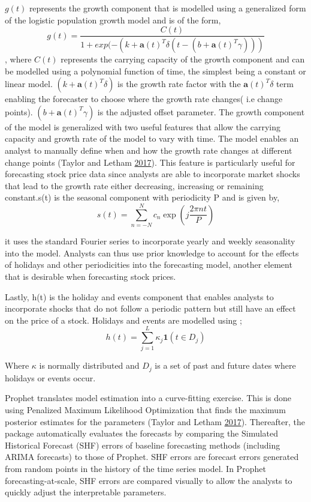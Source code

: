 \documentclass[12pt,preprint, authoryear]{elsarticle}
\numberwithin{equation}{section}
\numberwithin{figure}{section}
\numberwithin{table}{section}
\begin{document}
\(g(t)\) represents the growth component that is modelled using a
generalized form of the logistic population growth model and is of the
form,
\[g(t) = \frac{C(t)}{1+exp(-(k+\boldsymbol{a}(t)^T \delta(t-(b+\boldsymbol{a}(t)^T \gamma)))}\],
where \(C(t)\) represents the carrying capacity of the growth component
and can be modelled using a polynomial function of time, the simplest
being a constant or linear model. \((k+\boldsymbol{a}(t)^T\delta)\) is
the growth rate factor with the \(\boldsymbol{a}(t)^T\delta\) term
enabling the forecaster to choose where the growth rate changes( i.e
change points). \((b+\boldsymbol{a}(t)^T \gamma)\) is the adjusted
offset parameter. The growth component of the model is generalized with
two useful features that allow the carrying capacity and growth rate of
the model to vary with time. The model enables an analyst to manually
define when and how the growth rate changes at different change points
(Taylor and Letham \protect\hyperlink{ref-taylor2017forecasting}{2017}).
This feature is particularly useful for forecasting stock price data
since analysts are able to incorporate market shocks that lead to the
growth rate either decreasing, increasing or remaining constant.s(t) is
the seasonal component with periodicity P and is given by,
\[s(t) = \sum_{n = -N}^{N}c_n \exp(j\frac{2\pi nt}{P})\]

it uses the standard Fourier series to incorporate yearly and weekly
seasonality into the model. Analysts can thus use prior knowledge to
account for the effects of holidays and other periodicities into the
forecasting model, another element that is desirable when forecasting
stock prices.

Lastly, h(t) is the holiday and events component that enables analysts
to incorporate shocks that do not follow a periodic pattern but still
have an effect on the price of a stock. Holidays and events are modelled
using ;
\[ h(t) = \sum_{j = 1}^{L}\kappa_j \boldsymbol{1}(t \in D_j) \label{eqn5}
\]

Where \(\kappa\) is normally distributed and \(D_j\) is a set of past
and future dates where holidays or events occur.

Prophet translates model estimation into a curve-fitting exercise. This
is done using Penalized Maximum Likelihood Optimization that finds the
maximum posterior estimates for the parameters (Taylor and Letham
\protect\hyperlink{ref-taylor2017forecasting}{2017}). Thereafter, the
package automatically evaluates the forecasts by comparing the Simulated
Historical Forecast (SHF) errors of baseline forecasting methods
(including ARIMA forecasts) to those of Prophet. SHF errors are forecast
errors generated from random points in the history of the time series
model. In Prophet forecasting-at-scale, SHF errors are compared visually
to allow the analysts to quickly adjust the interpretable parameters.
\end{document}
